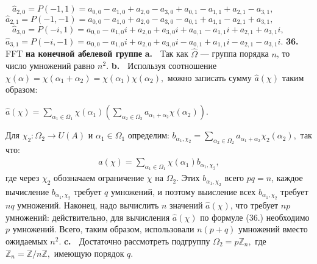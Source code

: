 \documentclass{../../template/mai_book}
\begin{document}
$\;\;\:\hat a_{2,0} = P(-1,1) = a_{0,0} - a_{1,0} + a_{2,0} - a_{3,0} + a_{0,1} - a_{1,1} + a_{2,1} - a_{3,1},$ \newline \indent
$\hat a_{2,1} = P(-1,-1) = a_{0,0} - a_{1,0} + a_{2,0} - a_{3,0} - a_{0,1} + a_{1,1} - a_{2,1} + a_{3,1},$ \newline \indent
$\;\;\:\hat a_{3,0} = P(-i,1) = a_{0,0} - a_{1,0}i + a_{2,0} + a_{3,0}i + a_{0,1} - a_{1,1}i + a_{2,1} + a_{3,1}i,$ \newline \indent
$\hat a_{3,1} = P(-i,-1) = a_{0,0} - a_{1,0}i + a_{2,0} + a_{3,0}i - a_{0,1} + a_{1,1}i - a_{2,1} - a_{3,1}i.$ \newline \newline
\textbf{36.} FFT \textbf{на конечной абелевой группе} \newline \newline \indent
\textbf{a.} $\;$ Так как $\hat \Omega$ --- группа порядка $n$, то число умножений равно $n^2.$ \newline \indent
\textbf{b.} $\;$ Используя соотношение $\chi (\alpha) = \chi (\alpha_1 + \alpha_2) = \chi (\alpha_1)\chi (\alpha_2),$ можно записать сумму $\hat a (\chi)$ таким образом:
\begin{center}
$\hat a (\chi) = \sum \limits_{\alpha_1 \in \Omega_1}\chi(\alpha_1)(\sum \limits_{\alpha_2 \in \Omega_2}a_{\alpha_1 + \alpha_2}\chi(\alpha_2)).$
\end{center} 
Для $\chi_2 : \Omega_2 \rightarrow U(A)$ и $\alpha_1 \in \Omega_1$ определим: $b_{\alpha_1 , \chi_2} = \sum_{\alpha_2 \in \Omega_2}a_{\alpha_1 + \alpha_2}\chi_2 (\alpha_2),$ так что: 
\begin{align}
\hat a (\chi) = \sum \limits_{\alpha_1 \in \Omega_1}\chi (\alpha_1)b_{\alpha_1 , \chi_2} \tag{13},
\end{align}
где через $\chi_2$ обозначаем ограничение $\chi$ на $\Omega_2$. Этих $b_{\alpha_1 , \chi_2}$ всего $pq = n$, каждое вычисление $b_{\alpha_1 , \chi_2}$ требует $q$ умножений, и поэтому выисление всех $b_{\alpha_1 , \chi_2}$ требует $nq$ умножений. Наконец, надо вычислить $n$ значений $\hat a (\chi)$, что требует $np$ умножений: действительно, для вычисления $\hat a (\chi)$ по формуле (36.) необходимо $p$ умножений. Всего, таким образом, использовали $n(p + q)$ умножений вместо ожидаемых $n^2$. \newline \indent
\textbf{c.} $\;$ Достаточно рассмотреть подгруппу $\Omega_2 = p \mathds{Z}_n,$ где $\mathds{Z}_n = \mathds{Z}/ n \mathds{Z},$ имеющую порядок $q.$ \newline \newline
\end{document}
